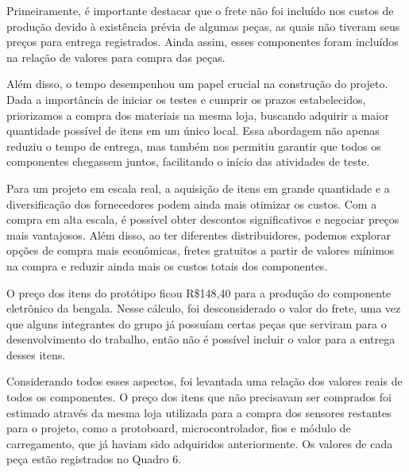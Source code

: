     Primeiramente, é importante destacar que o frete não foi incluído nos custos de produção devido à existência prévia de algumas peças, as quais não tiveram seus preços para entrega registrados. Ainda assim, esses componentes foram incluídos na relação de valores para compra das peças. 

    Além disso, o tempo desempenhou um papel crucial na construção do projeto. Dada a importância de iniciar os testes e cumprir os prazos estabelecidos, priorizamos a compra dos materiais na mesma loja, buscando adquirir a maior quantidade possível de itens em um único local. Essa abordagem não apenas reduziu o tempo de entrega, mas também nos permitiu garantir que todos os componentes chegassem juntos, facilitando o início das atividades de teste.

    Para um projeto em escala real, a aquisição de itens em grande quantidade e a diversificação dos fornecedores podem ainda mais otimizar os custos. Com a compra em alta escala, é possível obter descontos significativos e negociar preços mais vantajosos. Além disso, ao ter diferentes distribuidores, podemos explorar opções de compra mais econômicas, fretes gratuitos a partir de valores mínimos na compra e reduzir ainda mais os custos totais dos componentes.
    
    O preço dos itens do protótipo ficou R\$148,40 para a produção do componente eletrônico da bengala. Nesse cálculo, foi desconsiderado o valor do frete, uma vez que alguns integrantes do grupo já possuíam certas peças que serviram para o desenvolvimento do trabalho, então não é possível incluir o valor para a entrega desses itens.

    Considerando todos esses aspectos, foi levantada uma relação dos valores reais de todos os componentes. O preço dos itens que não precisavam ser comprados foi estimado através da mesma loja utilizada para a compra dos sensores restantes para o projeto, como a protoboard, microcontrolador, fios e módulo de carregamento, que já haviam sido adquiridos anteriormente. Os valores de cada peça estão registrados no Quadro 6.


